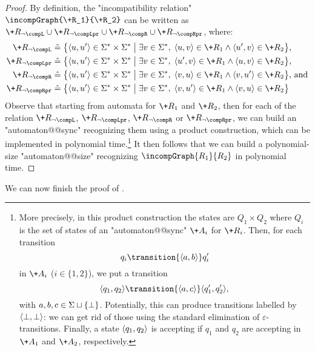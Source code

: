 \begin{proof}
    By definition, the "incompatibility relation" $\incompGraph{\+R_1}{\+R_2}$ can be written as
    $\+R_{\neg\compL} \cup \+R_{\neg\compLpr} \cup \+R_{\neg\compR} \cup \+R_{\neg\compRpr}$, where:
    \begin{align*}
        \+R_{\neg\compL} &\defeq \big\{ \tup{u,u'} \in \Sigma^* \times \Sigma^* \;\big\vert\; \exists v \in \Sigma^*,\; \tup{u,v} \in \+R_1 \land \tup{u',v} \in \+R_2 \big\} \text{,}\\
        \+R_{\neg\compLpr} &\defeq \big\{ \tup{u,u'} \in \Sigma^* \times \Sigma^* \;\big\vert\; \exists v \in \Sigma^*,\; \tup{u',v} \in \+R_1 \land \tup{u,v} \in \+R_2 \big\} \text{,}\\
        \+R_{\neg\compR} &\defeq \big\{ \tup{u,u'} \in \Sigma^* \times \Sigma^* \;\big\vert\; \exists v \in \Sigma^*,\; \tup{v,u} \in \+R_1 \land \tup{v,u'} \in \+R_2 \big\} \text{, and}\\
        \+R_{\neg\compRpr} &\defeq \big\{ \tup{u,u'} \in \Sigma^* \times \Sigma^* \;\big\vert\; \exists v \in \Sigma^*,\; \tup{v,u'} \in \+R_1 \land \tup{v,u} \in \+R_2 \big\}
    \end{align*}
    Observe that starting from automata for $\+R_1$ and $\+R_2$, then for each
    of the relation $\+R_{\neg\compL}$, $\+R_{\neg\compLpr}$, $\+R_{\neg\compR}$ or $\+R_{\neg\compRpr}$, we can build an "automaton@@sync" recognizing them
    using a product construction, which can be implemented in polynomial time.\footnote{More precisely, in this product construction the states are $Q_1 \times Q_2$
    where $Q_i$ is the set of states of an "automaton@@sync" $\+A_i$ for $\+R_i$. Then,
    for each transition
    \[
        q_i \transition{\tup{a,b}} q'_i
    \]
    in $\+A_i$
    ($i \in \{1,2\}$), we put a transition
    \[
        \tup{q_1,q_2} \transition{\tup{a,c}} \tup{q'_1,q'_2},
    \]
    with $a,b,c \in \Sigma\sqcup\{\bot\}$. Potentially, this
    can produce transitions labelled by $\langle\bot,\bot\rangle$: we can get rid of those
    using the standard elimination of $\varepsilon$-transitions.
    Finally, a state $\langle q_1,q_2\rangle$ is accepting if $q_1$ and $q_2$ are accepting
    in $\+A_1$ and $\+A_2$, respectively.}
    It then follows that we can build a polynomial-size "automaton@@size" recognizing
    $\incompGraph{R_1}{R_2}$ in polynomial time.
\end{proof}

We can now finish the proof of .

